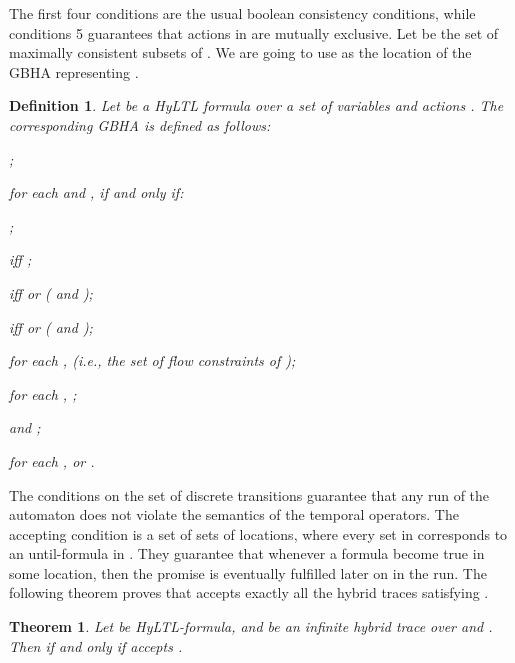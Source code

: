\documentclass[submission,copyright,creativecommons]{eptcs}
\newcommand{\hyltl}{\textsf{HyLTL}\xspace}
\newtheorem{definition}{Definition}
\newtheorem{theorem}{Theorem}
\begin{document}
\noindent The first four conditions are the usual boolean consistency conditions, while conditions 5 guarantees that actions in  are mutually exclusive.
Let  be the set of maximally consistent subsets of . We are going to use  as the location of the GBHA representing .

\begin{definition}\label{def:gbha-varphi}
Let  be a \hyltl formula over a set of variables  and actions . The corresponding GBHA  is defined as follows:
\begin{compactitem}
	\item ;
	\item for each  and ,  if and only if:
		\begin{compactitem}
			\item ;
			\item  iff ;
			\item  iff  or ( and );
			\item  iff  or ( and );
		\end{compactitem}
	\item for each ,  (i.e., the set of flow constraints of );
	\item for each , ;
	\item  and ;
	\item for each ,  or .
\end{compactitem}
\end{definition}

The conditions on the set of discrete transitions  guarantee that any run of the automaton does not violate the semantics of the temporal operators. The accepting condition  is a set of sets of locations, where every set in  corresponds to an until-formula in . They guarantee that whenever a formula  become true in some location, then the promise  is eventually fulfilled later on in the run.
The following theorem proves that  accepts exactly all the hybrid traces satisfying .

\begin{theorem}\label{teo:main}
Let  be \hyltl-formula, and  be an infinite hybrid trace over  and . Then  if and only if  accepts .
\end{theorem}
\end{document}

